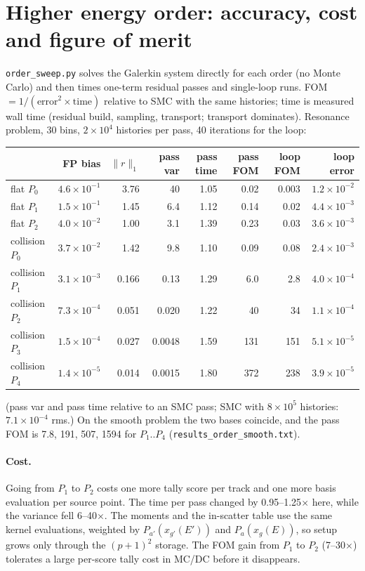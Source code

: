 \documentclass[11pt]{article}
\begin{document}
\section{Higher energy order: accuracy, cost and figure of merit}\label{sec:order}

\texttt{order\_sweep.py} solves the Galerkin system directly for each order (no Monte
Carlo) and then times one-term residual passes and single-loop runs. FOM
$=1/(\text{error}^2\times\text{time})$ relative to SMC with the same histories; time is
measured wall time (residual build, sampling, transport; transport dominates). Resonance
problem, 30 bins, $2\times10^4$ histories per pass, 40 iterations for the loop:

\begin{center}
\begin{tabular}{l rrr rrr r}
\toprule
 & FP bias & $\|r\|_1$ & pass var & pass time & pass FOM & loop FOM & loop error\\
\midrule
flat $P_0$ & $4.6\times10^{-1}$ & 3.76 & 40 & 1.05 & 0.02 & 0.003 & $1.2\times10^{-2}$\\
flat $P_1$ & $1.5\times10^{-1}$ & 1.45 & 6.4 & 1.12 & 0.14 & 0.02 & $4.4\times10^{-3}$\\
flat $P_2$ & $4.0\times10^{-2}$ & 1.00 & 3.1 & 1.39 & 0.23 & 0.03 & $3.6\times10^{-3}$\\
collision $P_0$ & $3.7\times10^{-2}$ & 1.42 & 9.8 & 1.10 & 0.09 & 0.08 & $2.4\times10^{-3}$\\
collision $P_1$ & $3.1\times10^{-3}$ & 0.166 & 0.13 & 1.29 & 6.0 & 2.8 & $4.0\times10^{-4}$\\
collision $P_2$ & $7.3\times10^{-4}$ & 0.051 & 0.020 & 1.22 & 40 & 34 & $1.1\times10^{-4}$\\
collision $P_3$ & $1.5\times10^{-4}$ & 0.027 & 0.0048 & 1.59 & 131 & 151 & $5.1\times10^{-5}$\\
collision $P_4$ & $1.4\times10^{-5}$ & 0.014 & 0.0015 & 1.80 & 372 & 238 & $3.9\times10^{-5}$\\
\bottomrule
\end{tabular}
\end{center}
\noindent (pass var and pass time relative to an SMC pass; SMC with $8\times10^5$
histories: $7.1\times10^{-4}$ rms.) On the smooth problem the two bases coincide, and the
pass FOM is 7.8, 191, 507, 1594 for $P_1$..$P_4$ (\texttt{results\_order\_smooth.txt}).

\paragraph{Cost.} Going from $P_1$ to $P_2$ costs one more tally score per track and one
more basis evaluation per source point. The time per pass changed by 0.95--1.25$\times$
here, while the variance fell 6--40$\times$. The moments and the in-scatter table use the
same kernel evaluations, weighted by $P_{a'}(x_{g'}(E'))$ and $P_a(x_g(E))$, so setup
grows only through the $(p+1)^2$ storage. The FOM gain from $P_1$ to $P_2$ (7--30$\times$)
tolerates a large per-score tally cost in MC/DC before it disappears.
\end{document}
